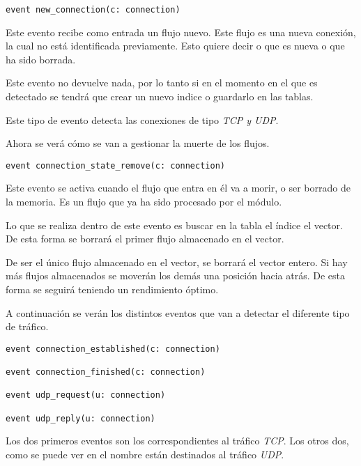 \begin{lstlisting}[style=CodigoC]
event new_connection(c: connection)

\end{lstlisting}

\intro Este evento recibe como entrada un flujo nuevo. Este flujo es una nueva conexión, la cual no está identificada 
previamente. Esto quiere decir o que es nueva o que ha sido borrada.

\intro Este evento no devuelve nada, por lo tanto si en el momento en el que es detectado se tendrá que crear un nuevo 
indice o guardarlo en las tablas.

\intro Este tipo de evento detecta las conexiones de tipo \textit{TCP y UDP}.

\intro Ahora se verá cómo se van a gestionar la muerte de los flujos.

\begin{lstlisting}[style=CodigoC]
event connection_state_remove(c: connection)

\end{lstlisting}

\intro Este evento se activa cuando el flujo que entra en él va a morir, o ser borrado de la memoria. Es un flujo 
que ya ha sido procesado por el módulo.

\intro Lo que se realiza dentro de este evento es buscar en la tabla el índice el vector. De esta forma 
se borrará el primer flujo almacenado en el vector.

\intro De ser el único flujo almacenado en el vector, se borrará el vector entero. Si hay más flujos almacenados 
se moverán los demás una posición hacia atrás. De esta forma se seguirá teniendo un rendimiento óptimo.

\intro A continuación se verán los distintos eventos que van a detectar el diferente tipo de tráfico.

\begin{lstlisting}[style=CodigoC]
event connection_established(c: connection)

event connection_finished(c: connection)

event udp_request(u: connection)

event udp_reply(u: connection)

\end{lstlisting}

\intro Los dos primeros eventos son los correspondientes al tráfico \textit{TCP}. Los otros dos, como se puede ver 
en el nombre están destinados al tráfico \textit{UDP}.

